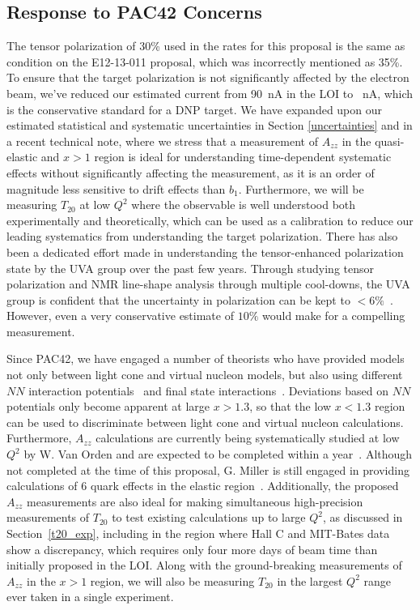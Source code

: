 \subsection{Response to PAC42 Concerns}
The tensor polarization of 30\% used in the rates for this proposal is the same as condition on the E12-13-011 proposal, which was incorrectly mentioned as 35\%. To ensure that the target polarization is not significantly affected by the electron beam, we've reduced our estimated current from 90~nA in the LOI to \CURRENT~nA, which is the conservative standard for a DNP target. We have expanded upon our estimated statistical and systematic uncertainties in Section \ref{uncertainties} and in a recent technical note\need, where we stress that a measurement of $A_{zz}$ in the quasi-elastic and $x>1$ region is ideal for understanding time-dependent systematic effects without significantly affecting the measurement, as it is an order of magnitude less sensitive to drift effects than $b_1$. Furthermore, we will be measuring $T_{20}$ at low $Q^2$ where the observable is well understood both experimentally and theoretically, which can be used as a calibration to reduce our leading systematics from understanding the target polarization. There has also been a dedicated effort made in understanding the tensor-enhanced polarization state by the UVA group over the past few years. Through studying tensor polarization and NMR line-shape analysis through multiple cool-downs, the UVA group is confident that the uncertainty in polarization can be kept to $<6\%$~\cite{keller2, keller3}. However, even a very conservative estimate of $10\%$ would make for a compelling measurement.


Since PAC42, we have engaged a number of theorists who have provided models not only between light cone and virtual nucleon models, but also using different $NN$ interaction potentials~\cite{Sargsian:2014fla} and final state interactions~\cite{cosyn-convo}. Deviations based on $NN$ potentials only become apparent at large $x>1.3$, so that the low $x<1.3$ region can be used to discriminate between light cone and virtual nucleon calculations. Furthermore, $A_{zz}$ calculations are currently being systematically studied at low $Q^2$ by W. Van Orden and are expected to be completed within a year~\cite{vanorden-convo}. Although not completed at the time of this proposal, G. Miller is still engaged in providing calculations of 6 quark effects in the elastic region~\cite{miller-convo}. Additionally, the proposed $A_{zz}$ measurements are also ideal for making simultaneous high-precision measurements of $T_{20}$ to test existing calculations up to large $Q^2$, as discussed in Section~\ref{t20_exp}, including in the region where Hall C and MIT-Bates data show a discrepancy, which requires only four more days of beam time than initially proposed in the LOI. Along with the ground-breaking measurements of $A_{zz}$ in the $x>1$ region, we will also be measuring $T_{20}$ in the largest $Q^2$ range ever taken in a single experiment.






